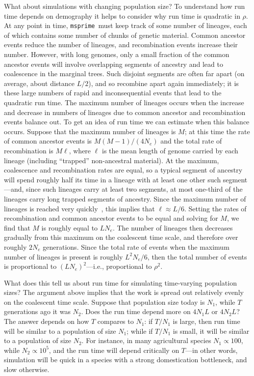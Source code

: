 \documentclass{article}
\newcommand{\msprime}[0]{\texttt{msprime}}
\begin{document}
What about simulations with changing population size?
To understand how run time depends on demography
it helps to consider why run time is quadratic in $\rho$.
At any point in time, \msprime\ must keep track of some number of lineages,
each of which contains some number of chunks of genetic material.
Common ancestor events reduce the number of lineages,
and recombination events increase their number.
However, with long genomes,
only a small fraction of the common ancestor events
will involve overlapping segments of ancestry
and lead to coalescence in the marginal trees.
Such disjoint segments are often far apart (on average, about distance $L/2$),
and so recombine apart again immediately;
it is these large numbers of rapid and inconsequential events that
lead to the quadratic run time.
The maximum number of lineages occurs when
the increase and decrease in numbers of lineages due to
common ancestor and recombination events balance out.
To get an idea of run time we can estimate when this balance occurs.
Suppose that the maximum number of lineages is $M$;
at this time the rate of common ancestor events is $M (M-1) / (4 N_e)$
and the total rate of recombination is $M \ell$,
where $\ell$ is the mean length of genome carried by each lineage
(including ``trapped'' non-ancestral material).
At the maximum, coalescence and recombination rates are equal,
so a typical segment of ancestry will spend roughly half its time
in a lineage with at least one other such segment---and,
since such lineages carry at least two segments,
at most one-third of the lineages carry long trapped segments of ancestry.
Since the maximum number of lineages is reached
very quickly~\citep{nelson2020accounting},
this implies that $\ell \approx L / 6$.
Setting the rates of recombination and common ancestor events
to be equal and solving for $M$,
we find that $M$ is roughly equal to $L N_e$.
The number of lineages then decreases gradually from this maximum
on the coalescent time scale, and therefore over roughly $2 N_e$ generations.
Since the total rate of events when the maximum number of lineages is
present is roughly $L^2 N_e / 6$,
then the total number of events is proportional to $(L N_e)^2$---i.e.,
proportional to $\rho^2$.

What does this tell us about run time for simulating time-varying population sizes?
The argument above implies that the work is spread out relatively
evenly on the coalescent time scale.
Suppose that population size today is $N_1$,
while $T$ generations ago it was $N_2$.
Does the run time depend more on $4 N_1 L$ or $4 N_2 L$?
The answer depends on how $T$ compares to $N_1$: if $T/N_1$ is large,
then run time will be similar to a population of size $N_1$;
while if $T/N_1$ is small, it will be similar to a population of size $N_2$.
For instance, in many agricultural species $N_1 \propto 100$, while $N_2 \propto 10^5$,
and the run time will depend critically on $T$---in other words,
simulation will be quick in a species with a strong domestication bottleneck,
and slow otherwise.
\end{document}
